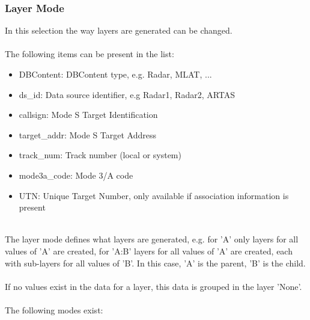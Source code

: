 \subsubsection{Layer Mode}
\label{sec:layer_mode}

In this selection the way layers are generated can be changed. \\\\

The following items can be present in the list:\\

\begin{itemize}
 \item DBContent: DBContent type, e.g. Radar, MLAT, ...
 \item ds\_id: Data source identifier, e.g Radar1, Radar2, ARTAS
 \item callsign: Mode S Target Identification
 \item target\_addr: Mode S Target Address
 \item track\_num: Track number (local or system)
 \item mode3a\_code: Mode 3/A code
 \item UTN: Unique Target Number, only available if association information is present
\end{itemize}
\ \\

The layer mode defines what layers are generated, e.g. for 'A' only layers for all values of 'A' are created, for 'A:B' layers for all values of 'A' are created, each with sub-layers for all values of 'B'. In this case, 'A' is the parent, 'B' is the child. \\\\

If no values exist in the data for a layer, this data is grouped in the layer 'None'.\\\\

The following modes exist: \\


